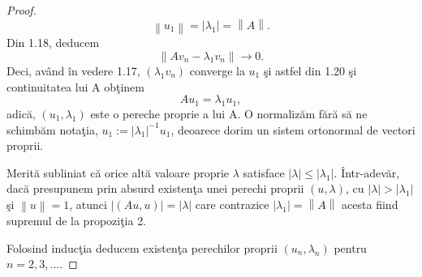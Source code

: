 \documentclass[a4paper,12pt,oneside]{report}
\begin{document}
\begin{proof}
\begin{displaymath}
  \left \| u_{1} \right \|  = \left | \lambda _{1} \right | = \left \| A \right \|. \label{eq:1.19} \tag{1.19}
\end{displaymath}
Din 1.18, deducem
\begin{displaymath}
  \left \| Av_{n}  - \lambda _{1}v_{n}\right \| \rightarrow 0. \label{eq:1.20} \tag{1.20}
\end{displaymath}
Deci, av\^{a}nd \^{i}n vedere 1.17, \(\left ( \lambda _{1}v_{n} \right )\)  converge la \(u_{1}\) \c{s}i astfel din 1.20 \c{s}i continuitatea lui A ob\c{t}inem
\begin{displaymath}
  Au_{1} = \lambda _{1}u_{1},
\end{displaymath}
adic\u{a}, \(\left ( u_{1},\lambda _{1} \right )\) este o pereche proprie a lui A. O normaliz\u{a}m f\u{a}r\u{a} s\u{a} ne schimb\u{a}m notaţia, \(u_{1} := \left | \lambda _{1} \right |^{-1}u_{1}\), deoarece dorim un sistem ortonormal de vectori proprii.

\noindent Merit\u{a} subliniat c\u{a} orice alt\u{a} valoare proprie \( \lambda\) satisface \(\left | \lambda  \right |\leq \left | \lambda _{1} \right |\). \^{I}ntr-adev\u{a}r, dac\u{a} presupunem prin absurd existenţa unei perechi proprii \(\left ( u,\lambda  \right )\), cu \(\left | \lambda  \right |> \left | \lambda _{1} \right |\) \c{s}i \(\left \| u \right \|=1\), atunci \(\left | \left ( Au,u \right ) \right | = \left | \lambda  \right |\) care contrazice \(\left | \lambda_{1}  \right | = \left \| A \right \|\) acesta fiind supremul de la propozi\c{t}ia 2.

Folosind induc\c{t}ia deducem existen\c{t}a perechilor proprii \(\left ( u_{n},\lambda _{n} \right )\) pentru \(n=2,3,...\).


\end{proof}
\end{document}
